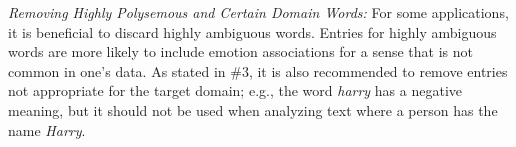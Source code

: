 \documentclass[11pt]{article}
\begin{document}
\noindent \textit{Removing Highly Polysemous and Certain Domain Words:} For some applications, it is beneficial to discard highly ambiguous words. %
Entries for highly ambiguous words are more likely to include emotion associations for a sense that is not common in one's data.
As stated in \#3, it is also recommended to remove entries not appropriate for the target domain; e.g., 
the word {\it harry} has a negative meaning, but it should not be used when analyzing text where 
a person has the name \textit{Harry}.\\[-10pt]

\end{document}
